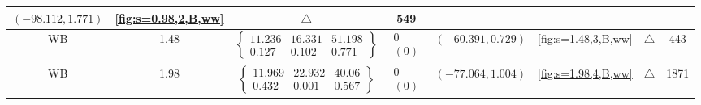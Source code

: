 \begin{table}[H]
\begin{adjustwidth}{-2.5cm}{-2.5cm}
{\begin{tabular}{|c|c|c|c|c|c|c|c|}
$(-98.112, 1.771)$ & 
\ref{fig:s=0.98,2,B,ww} & $\triangle$ & 549 \\
\hline
WB & 1.48 & $\left\{\begin{array}{ccc}
11.236 & 16.331 & 51.198 \\
0.127 & 0.102 & 0.771
\end{array}\right\}$ &
$\begin{array}{c}
0 \\
(0)
\end{array}$ & 
$(-60.391, 0.729)$ & 
\ref{fig:s=1.48,3,B,ww} & $\triangle$ & 443 \\
\hline
WB & 1.98 & $\left\{\begin{array}{ccc}
11.969 & 22.932 & 40.06 \\
0.432 & 0.001 & 0.567
\end{array}\right\}$ &
$\begin{array}{c}
0 \\
(0)
\end{array}$ & 
$(-77.064, 1.004)$ & 
\ref{fig:s=1.98,4,B,ww} & $\triangle$ & 1871 \\
\hline
\end{tabular}
}
\end{adjustwidth}
\end{table}

